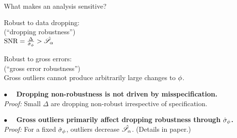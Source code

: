 
\begin{frame}[t]{What makes an analysis sensitive?}
%
\begin{minipage}[t]{0.45\textwidth}
\begin{center}
    Robust to data dropping:\\
    (``dropping robustness'')\\
    \vspace{1em}
    $\textrm{SNR} = \frac{\Delta}{\hat\sigma_{\phi}} > \hat{\mathscr{S}}_\alpha$
\end{center}
\end{minipage}
%
\begin{minipage}[t]{0.45\textwidth}
\begin{center}
    Robust to gross errors:\\
    (``gross error robustness'')\\
    \vspace{1em}
    Gross outliers cannot produce
    arbitrarily large changes to $\phi$.
\end{center}
\end{minipage}

\vspace{1em}
\hrulefill

\vspace{1em} $\bullet\quad$
\textbf{Dropping non-robustness is not driven by misspecification.\\}
\textit{Proof: }
Small $\Delta$ are dropping non-robust irrespective of specification.

\vspace{1em} $\bullet\quad$
\textbf{Gross outliers primarily affect dropping robustness through $\hat\sigma_{\phi}$.\\}
\textit{Proof: }
For a fixed $\hat\sigma_{\phi}$, outliers decrease $\hat{\mathscr{S}}_\alpha$.
(Details in paper.)

\end{frame}





